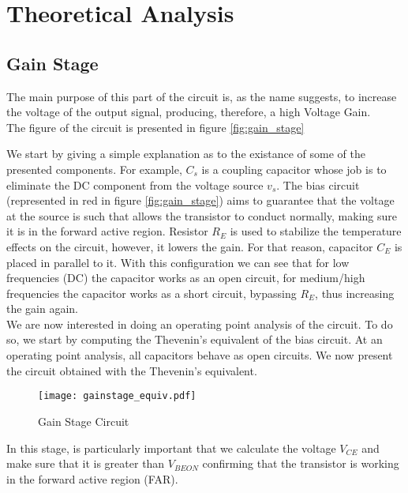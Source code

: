 \section{Theoretical Analysis}
\label{sec:theoretical}



\subsection{Gain Stage}
\par The main purpose of this part of the circuit is, as the name suggests, to increase the voltage of the output signal, producing, therefore, a high Voltage Gain.\\
The figure of the circuit is presented in figure \ref{fig:gain_stage}


We start by giving a simple explanation as to the existance of some of the presented components. For example, $C_s$ is a coupling capacitor whose job is to eliminate the DC component from the voltage source $v_s$. The bias circuit (represented in red in figure \ref{fig:gain_stage}) aims to guarantee that the voltage at the source is such that allows the transistor to conduct normally, making sure it is in the forward active region.
Resistor $R_E$ is used to stabilize the temperature effects on the circuit, however, it lowers the gain. For that reason, capacitor $C_E$ is placed in parallel to it. With this configuration we can see that for low frequencies (DC) the capacitor works as an open circuit, for medium/high frequencies the capacitor works as a short circuit, bypassing $R_E$, thus increasing the gain again.\\

We are now interested in doing an operating point analysis of the circuit. To do so, we start by computing the Thevenin's equivalent of the bias circuit. At an operating point analysis, all capacitors behave as open circuits. We now present the circuit obtained with the Thevenin's equivalent.


\begin{figure}[H]
\centering
\texttt{[image: gainstage\_equiv.pdf]}
\caption{Gain Stage Circuit}
\label{fig:gain_stage_circuit}
\end{figure}


In this stage, is particularly important that we calculate the voltage $V_{CE}$ and make sure that it is greater than $V_{BEON}$ confirming that the transistor is working in the forward active region (FAR).\\

